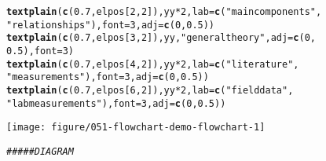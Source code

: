 \documentclass{article}\usepackage[]{graphicx}\usepackage[]{color}
\makeatletter
\def\maxwidth{ %
  \ifdim\Gin@nat@width>\linewidth
    \linewidth
  \else
    \Gin@nat@width
  \fi
}
\newcommand{\hlnum}[1]{\textcolor[rgb]{0.686,0.059,0.569}{#1}}%
\newcommand{\hlstr}[1]{\textcolor[rgb]{0.192,0.494,0.8}{#1}}%
\newcommand{\hlcom}[1]{\textcolor[rgb]{0.678,0.584,0.686}{\textit{#1}}}%
\newcommand{\hlopt}[1]{\textcolor[rgb]{0,0,0}{#1}}%
\newcommand{\hlstd}[1]{\textcolor[rgb]{0.345,0.345,0.345}{#1}}%
\newcommand{\hlkwc}[1]{\textcolor[rgb]{0.333,0.667,0.333}{#1}}%
\newcommand{\hlkwd}[1]{\textcolor[rgb]{0.737,0.353,0.396}{\textbf{#1}}}%
\newenvironment{kframe}{%
 \def\at@end@of@kframe{}%
 \ifinner\ifhmode%
  \def\at@end@of@kframe{\end{minipage}}%
  \begin{minipage}{\columnwidth}%
 \fi\fi%
 \def\FrameCommand##1{\hskip\@totalleftmargin \hskip-\fboxsep
 \colorbox{shadecolor}{##1}\hskip-\fboxsep
     \hskip-\linewidth \hskip-\@totalleftmargin \hskip\columnwidth}%
 \MakeFramed {\advance\hsize-\width
   \@totalleftmargin\z@ \linewidth\hsize
   \@setminipage}}%
 {\par\unskip\endMakeFramed%
 \at@end@of@kframe}
\newenvironment{knitrout}{}{} %
\makeatother
\begin{document}
\begin{knitrout}
\begin{kframe}
\begin{alltt}
\hlkwd{textplain}\hlstd{(}\hlkwd{c}\hlstd{(}\hlnum{0.7}\hlstd{, elpos[}\hlnum{2}\hlstd{,} \hlnum{2}\hlstd{]), yy} \hlopt{*} \hlnum{2}\hlstd{,} \hlkwc{lab} \hlstd{=} \hlkwd{c}\hlstd{(}\hlstr{"main components"}\hlstd{,}
    \hlstr{"relationships"}\hlstd{),} \hlkwc{font} \hlstd{=} \hlnum{3}\hlstd{,} \hlkwc{adj} \hlstd{=} \hlkwd{c}\hlstd{(}\hlnum{0}\hlstd{,} \hlnum{0.5}\hlstd{))}
\hlkwd{textplain}\hlstd{(}\hlkwd{c}\hlstd{(}\hlnum{0.7}\hlstd{, elpos[}\hlnum{3}\hlstd{,} \hlnum{2}\hlstd{]), yy,} \hlstr{"general theory"}\hlstd{,} \hlkwc{adj} \hlstd{=} \hlkwd{c}\hlstd{(}\hlnum{0}\hlstd{,}
    \hlnum{0.5}\hlstd{),} \hlkwc{font} \hlstd{=} \hlnum{3}\hlstd{)}
\hlkwd{textplain}\hlstd{(}\hlkwd{c}\hlstd{(}\hlnum{0.7}\hlstd{, elpos[}\hlnum{4}\hlstd{,} \hlnum{2}\hlstd{]), yy} \hlopt{*} \hlnum{2}\hlstd{,} \hlkwc{lab} \hlstd{=} \hlkwd{c}\hlstd{(}\hlstr{"literature"}\hlstd{,}
    \hlstr{"measurements"}\hlstd{),} \hlkwc{font} \hlstd{=} \hlnum{3}\hlstd{,} \hlkwc{adj} \hlstd{=} \hlkwd{c}\hlstd{(}\hlnum{0}\hlstd{,} \hlnum{0.5}\hlstd{))}
\hlkwd{textplain}\hlstd{(}\hlkwd{c}\hlstd{(}\hlnum{0.7}\hlstd{, elpos[}\hlnum{6}\hlstd{,} \hlnum{2}\hlstd{]), yy} \hlopt{*} \hlnum{2}\hlstd{,} \hlkwc{lab} \hlstd{=} \hlkwd{c}\hlstd{(}\hlstr{"field data"}\hlstd{,}
    \hlstr{"lab measurements"}\hlstd{),} \hlkwc{font} \hlstd{=} \hlnum{3}\hlstd{,} \hlkwc{adj} \hlstd{=} \hlkwd{c}\hlstd{(}\hlnum{0}\hlstd{,} \hlnum{0.5}\hlstd{))}
\end{alltt}
\end{kframe}
\texttt{[image: figure/051-flowchart-demo-flowchart-1]} 
\begin{kframe}\begin{alltt}
\hlcom{##### DIAGRAM}


\end{alltt}
\end{kframe}
\end{knitrout}
\end{document}

